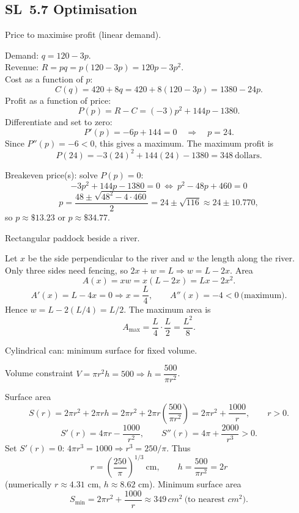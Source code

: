 \documentclass[11pt]{article}
\def\textbf#1{#1}%
\def\mathrm#1{#1}%
\newcommand{\tocsubsection}[1]{\subsection{#1}}
\begin{document}

\tocsubsection{SL 5.7 \; Optimisation}


\begin{solution}
\textbf{Price to maximise profit (linear demand).}

Demand: \(q=120-3p\). \\
Revenue: \(R=pq=p(120-3p)=120p-3p^{2}\). \\
Cost as a function of \(p\):
\[
C(q)=420+8q=420+8(120-3p)=1380-24p.
\]
Profit as a function of price:
\[
P(p)=R-C=(-3)p^{2}+144p-1380.
\]
Differentiate and set to zero:
\[
P'(p)=-6p+144=0 \quad\Rightarrow\quad p=24.
\]
Since \(P''(p)=-6<0\), this gives a maximum.  The maximum profit is
\[
P(24)=-3(24)^{2}+144(24)-1380=348\ \text{dollars}.
\]

Breakeven price(s): solve \(P(p)=0\):
\[
-3p^{2}+144p-1380=0 \ \Longleftrightarrow\ p^{2}-48p+460=0
\]
\[
p=\frac{48\pm\sqrt{48^{2}-4\cdot 460}}{2}=24\pm\sqrt{116}
\approx 24\pm 10.770,
\]
so \(p\approx \$13.23\) or \(p\approx \$34.77\).
\end{solution}

\begin{solution}
\textbf{Rectangular paddock beside a river.}

Let \(x\) be the side perpendicular to the river and \(w\) the length along the river.
Only three sides need fencing, so \(2x+w=L \Rightarrow w=L-2x\).
Area
\[
A(x)=xw=x(L-2x)=Lx-2x^{2}.
\]
\[
A'(x)=L-4x=0 \Rightarrow x=\frac{L}{4},\qquad
A''(x)=-4<0 \ \text{(maximum)}.
\]
Hence \(w=L-2(L/4)=L/2\).
The maximum area is
\[
A_{\max}=\frac{L}{4}\cdot \frac{L}{2}=\frac{L^{2}}{8}.
\]
\end{solution}


\begin{solution}
\textbf{Cylindrical can: minimum surface for fixed volume.}

Volume constraint \(V=\pi r^{2}h=500\Rightarrow h=\dfrac{500}{\pi r^{2}}\).

Surface area
\[
S(r)=2\pi r^{2}+2\pi r h
      =2\pi r^{2}+2\pi r\left(\frac{500}{\pi r^{2}}\right)
      =2\pi r^{2}+\frac{1000}{r},\qquad r>0.
\]
\[
S'(r)=4\pi r-\frac{1000}{r^{2}},\qquad 
S''(r)=4\pi+\frac{2000}{r^{3}}>0.
\]
Set \(S'(r)=0\): \(4\pi r^{3}=1000\Rightarrow r^{3}=250/\pi\).  
Thus
\[
\boxed{\,r=\left(\frac{250}{\pi}\right)^{1/3}\ \text{cm},\qquad
h=\frac{500}{\pi r^{2}}=2r\, } 
\]
(numerically \(r\approx 4.31\) cm, \(h\approx 8.62\) cm).  
Minimum surface area
\[
S_{\min}=2\pi r^{2}+\frac{1000}{r}\approx 349\,\mathrm{cm}^{2}\ \text{(to nearest }\mathrm{cm}^{2}\text{)}.
\]
\end{solution}
\end{document}

